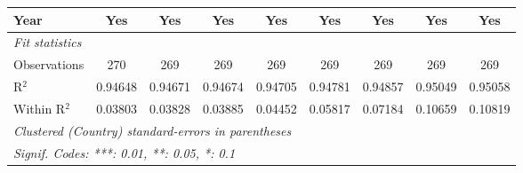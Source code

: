 \begin{table}[htbp]
\begin{tabular}{lcccccccc}
      Year                                            & Yes             & Yes             & Yes      & Yes      & Yes                    & Yes                    & Yes      & Yes\\  
      \midrule
      \emph{Fit statistics}\\
      Observations                                    & 270             & 269             & 269      & 269      & 269                    & 269                    & 269      & 269\\  
      R$^2$                                           & 0.94648         & 0.94671         & 0.94674  & 0.94705  & 0.94781                & 0.94857                & 0.95049  & 0.95058\\  
      Within R$^2$                                    & 0.03803         & 0.03828         & 0.03885  & 0.04452  & 0.05817                & 0.07184                & 0.10659  & 0.10819\\  
      \midrule \midrule
      \multicolumn{9}{l}{\emph{Clustered (Country) standard-errors in parentheses}}\\
      \multicolumn{9}{l}{\emph{Signif. Codes: ***: 0.01, **: 0.05, *: 0.1}}\\
   \end{tabular}
\end{table}


